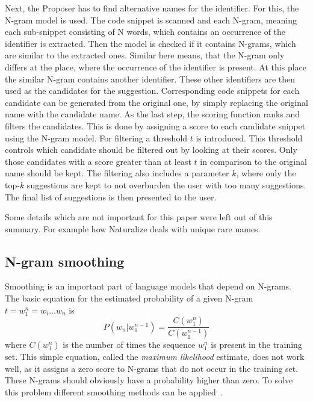 Next, the Proposer has to find alternative names for the identifier. For this, the N-gram model is used. The code snippet is scanned and each N-gram, meaning each sub-snippet consisting of N words, which contains an occurrence of the identifier is extracted. Then the model is checked if it contains N-grams, which are similar to the extracted ones. Similar here means, that the N-gram only differs at the place, where the occurrence of the identifier is present. At this place the similar N-gram contains another identifier. These other identifiers are then used as the candidates for the suggestion. Corresponding code snippets for each candidate can be generated from the original one, by simply replacing the original name with the candidate name. As the last step, the scoring function ranks and filters the candidates. This is done by assigning a score to each candidate snippet using the N-gram model.
For filtering a threshold $t$ is introduced. This threshold controls which candidate should be filtered out by looking at their scores. Only those candidates with
a score greater than at least $t$ in comparison to the original name should be kept. The filtering also includes a parameter $k$, where only the top-$k$ suggestions are kept to not overburden the user with too many suggestions. The final list of suggestions is then presented to the user.

Some details which are not important for this paper were left out of this summary. For example how
Naturalize deals with unique rare names.

\subsection{N-gram smoothing}
Smoothing is an important part of language models that depend on N-grams. The basic equation for the estimated probability of a given N-gram $t=w_1^n=w_i\hdots w_n$ is
\begin{equation}
    P(w_n | w_1^{n-1}) =  \frac{C(w_1^n)}{C(w_1^{n-1})}
\end{equation}
where $C(w_1^n)$ is the number of times the sequence $w_1^n$ is present in the training set.
This simple equation, called the \emph{maximum likelihood} estimate, does not work well, as it assigns a zero score to N-grams that do not occur in the training set. These N-grams should obviously have a probability higher than zero. To solve this problem different smoothing methods can be applied~\cite{smoothingStudy}.

